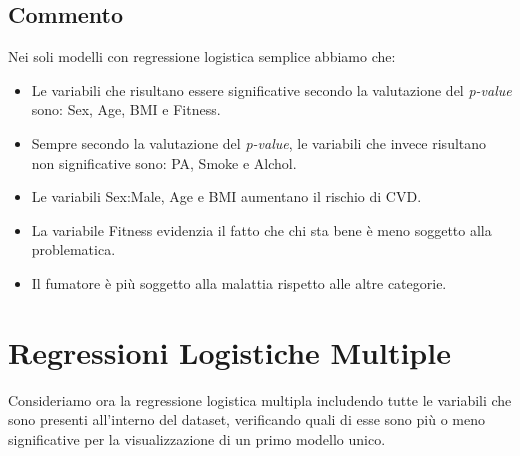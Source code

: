 \documentclass{article}\usepackage[]{graphicx}\usepackage[]{xcolor}
\begin{document}
  \subsection{Commento}
    Nei soli modelli con regressione logistica semplice abbiamo che:
    \begin{itemize}
      \item Le variabili che risultano essere significative secondo la valutazione
            del \emph{p-value} sono: Sex, Age, BMI e Fitness.
      \item Sempre secondo la valutazione del \emph{p-value}, le variabili che 
            invece risultano non significative sono: PA, Smoke e Alchol.
      \item Le variabili Sex:Male, Age e BMI aumentano il rischio di CVD.
      \item La variabile Fitness evidenzia il fatto che chi sta bene è meno
            soggetto alla problematica.
      \item Il fumatore è più soggetto alla malattia rispetto alle altre categorie.
    \end{itemize}
  
\clearpage
  
\section{Regressioni Logistiche Multiple}
  Consideriamo ora la regressione logistica multipla includendo tutte le variabili
  che sono presenti all'interno del dataset, verificando quali di esse sono più 
  o meno significative per la visualizzazione di un primo modello unico.
  
\end{document}
